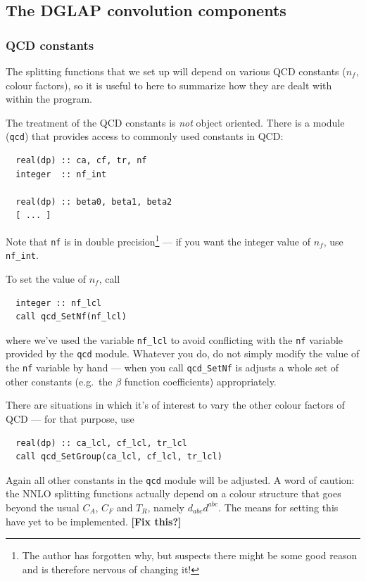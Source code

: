 \documentclass[12pt]{article}
\newcommand{\comment}[1]{\textbf{[#1]}}
\newcommand{\eg}{e.g.\ }
\newcommand{\ttt}[1]{\texttt{#1}}
\begin{document}
\subsection{The DGLAP convolution components}
\label{sec:dglap_holder}

\subsubsection{QCD constants}
\label{sec:qcd}

The splitting functions that we set up will depend on various QCD
constants ($n_f$, colour factors), so it is useful to here to
summarize how they are dealt with within the program.

The treatment of the QCD constants is \emph{not} object oriented.
There is a module (\ttt{qcd}) that provides access to commonly used
constants in QCD:
\begin{verbatim}
  real(dp) :: ca, cf, tr, nf
  integer  :: nf_int
  
  real(dp) :: beta0, beta1, beta2
  [ ... ]
\end{verbatim}
Note that \ttt{nf} is in double precision\footnote{The author has
  forgotten why, but suspects there might be some good reason and is
  therefore nervous of changing it!} --- if you want the integer value
of $n_f$, use \ttt{nf\_int}. 

To set the value of $n_f$, call
\begin{verbatim}
  integer :: nf_lcl
  call qcd_SetNf(nf_lcl)  
\end{verbatim}
where we've used the variable \ttt{nf\_lcl} to avoid conflicting with
the \ttt{nf} variable provided by the \ttt{qcd} module. Whatever you
do, do not simply modify the value of the \ttt{nf} variable by hand
--- when you call \ttt{qcd\_SetNf} is adjusts a whole set of other
constants (\eg the $\beta$ function coefficients) appropriately.

There are situations in which it's of interest to vary the other
colour factors of QCD --- for that purpose, use
\begin{verbatim}
  real(dp) :: ca_lcl, cf_lcl, tr_lcl
  call qcd_SetGroup(ca_lcl, cf_lcl, tr_lcl)
\end{verbatim}
Again all other constants in the \ttt{qcd} module will be adjusted. A
word of caution: the NNLO splitting functions actually depend on a
colour structure that goes beyond the usual $C_A$, $C_F$ and $T_R$,
namely $d_{abc}d^{abc}$. The means for setting this have yet to be
implemented. \comment{Fix this?}
\end{document}
